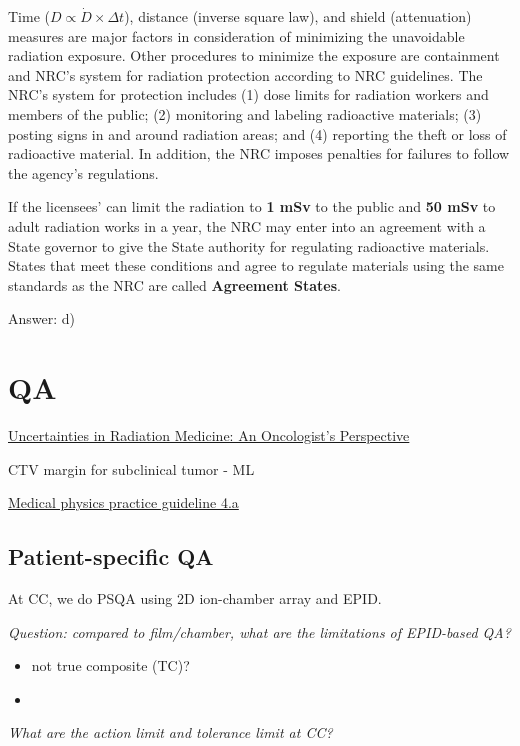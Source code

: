 \documentclass[]{book}
\theoremstyle{definition}
\theoremstyle{definition}
\theoremstyle{definition}
\theoremstyle{remark}
\begin{document}
Time (\(D \propto \dot{D}\times \Delta t\)), distance (inverse square
law), and shield (attenuation) measures are major factors in
consideration of minimizing the unavoidable radiation exposure. Other
procedures to minimize the exposure are containment and NRC's system for
radiation protection according to NRC guidelines. The NRC's system for
protection includes (1) dose limits for radiation workers and members of
the public; (2) monitoring and labeling radioactive materials; (3)
posting signs in and around radiation areas; and (4) reporting the theft
or loss of radioactive material. In addition, the NRC imposes penalties
for failures to follow the agency's regulations.

If the licensees' can limit the radiation to \textbf{1 mSv} to the
public and \textbf{50 mSv} to adult radiation works in a year, the NRC
may enter into an agreement with a State governor to give the State
authority for regulating radioactive materials. States that meet these
conditions and agree to regulate materials using the same standards as
the NRC are called \textbf{Agreement States}.

Answer: d)

\chapter{QA}\label{qa}

\href{https://vimeo.com/76862861}{Uncertainties in Radiation Medicine:
An Oncologist's Perspective}

CTV margin for subclinical tumor - ML

\href{https://aapm.onlinelibrary.wiley.com/doi/full/10.1120/jacmp.v16i3.5431}{Medical
physics practice guideline 4.a}

\section{Patient-specific QA}\label{patient-specific-qa}

At CC, we do PSQA using 2D ion-chamber array and EPID.

\emph{Question: compared to film/chamber, what are the limitations of
EPID-based QA?}

\begin{itemize}
\item
  not true composite (TC)?
\item
\end{itemize}

\emph{What are the action limit and tolerance limit at CC?}
\end{document}
